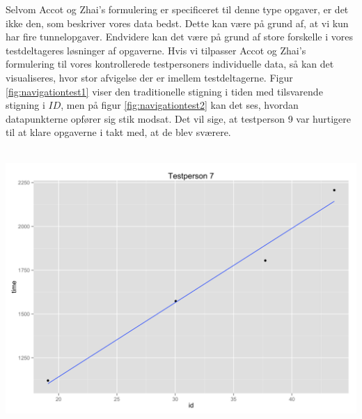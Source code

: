 Selvom Accot og Zhai's formulering er specificeret til denne type opgaver, er det ikke den, som beskriver vores data bedst. Dette kan være på grund af, at vi kun har fire tunnelopgaver. Endvidere kan det være på grund af store forskelle i vores testdeltageres løsninger af opgaverne. Hvis vi tilpasser Accot og Zhai's formulering til vores kontrollerede testpersoners individuelle data, så kan det visualiseres, hvor stor afvigelse der er imellem testdeltagerne. Figur \ref{fig:navigationtest1} viser den traditionelle stigning i tiden med tilsvarende stigning i $ID$, men på figur \ref{fig:navigationtest2} kan det ses, hvordan datapunkterne opfører sig stik modsat. Det vil sige, at testperson 9 var hurtigere til at klare opgaverne i takt med, at de blev sværere.\\\\
\begin{minipage}{\linewidth}
	\begin{minipage}[b]{.45\linewidth}
		\includegraphics[width=\textwidth]{images/plots/plot_model_test_navigation_1}
		\label{fig:navigationtest1}
	\end{minipage}
	\begin{minipage}[b]{0.1\linewidth}
	~
	\end{minipage}
	\begin{minipage}[b]{0.45\linewidth}

\end{minipage}
\end{minipage}
